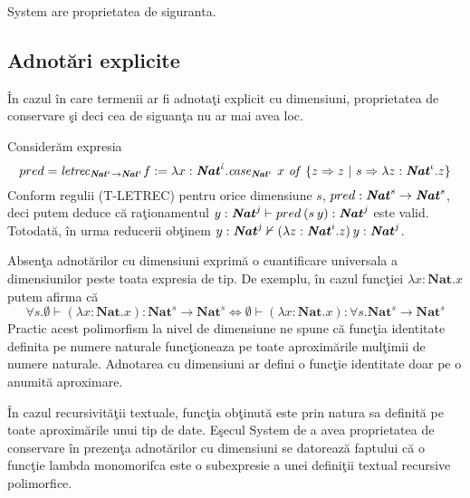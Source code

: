 \begin{corollary}
System \fhat are proprietatea de siguranta.
\end{corollary}

\subsection{Adnot\u ari explicite}

\^ In cazul \^ in care termenii ar fi adnota\c ti explicit cu dimensiuni, proprietatea de conservare \c si deci cea de siguan\c ta nu ar mai avea loc.
\begin{example}
Consider\u am expresia
$$ pred = \text{\emph{letrec}}_{\textbf{\emph{Nat}}^{\iota}\to\textbf{\emph{Nat}}^{\iota}} f := \lambda x: \textbf{\emph{Nat}}^{\hat{\iota}}.\text{\emph{case}}_{\textbf{\emph{Nat}}^{\iota}}\ x \text{ \emph{of} } \{ z \Rightarrow z\ |\ s \Rightarrow \lambda z : \textbf{\emph{Nat}}^{\iota}.z \}$$
Conform regulii {\scriptsize (T-LETREC)} pentru orice dimensiune $s$, $pred : \textbf{\emph{Nat}}^s \to \textbf{\emph{Nat}}^s$, deci putem deduce c\u a ra\c tionamentul $y : \textbf{\emph{Nat}}^j \vdash pred \hspace{2pt} (s \hspace{2pt} y) : \textbf{\emph{Nat}}^j$ este valid. Totodat\u a, \^ in urma reducerii ob\c tinem $y : \textbf{\emph{Nat}}^j \nvdash (\lambda z : \textbf{\emph{Nat}}^i.z)\hspace{2pt} y : \textbf{\emph{Nat}}^j$.
\end{example}

Absen\c ta adnot\u arilor cu dimensiuni exprim\u a o cuantificare universala a dimensiunilor peste toata expresia de tip. De exemplu, \^ in cazul func\c tiei $\lambda x : \textbf{Nat} . x$ putem afirma c\u a
$$\forall s . \emptyset \vdash (\lambda x : \textbf{Nat} . x) :  \textbf{Nat}^s \to  \textbf{Nat}^s \Leftrightarrow \emptyset \vdash (\lambda x : \textbf{Nat} . x) :  \forall s. \textbf{Nat}^s \to  \textbf{Nat}^s$$
Practic acest polimorfism la nivel de dimensiune ne spune c\u a func\c tia identitate definita pe numere naturale func\c tioneaza pe toate aproxim\u arile mul\c timii de numere naturale. Adnotarea cu dimensiuni ar defini o func\c tie identitate doar pe o anumit\u a aproximare.

\^ In cazul recursivit\u a\c tii textuale, func\c tia ob\c tinut\u a este prin natura sa definit\u a pe toate aproxim\u arile unui tip de date. E\c secul System \fhat de a avea proprietatea de conservare \^ in prezen\c ta adnot\u arilor cu dimensiuni se datoreaz\u a faptului c\u a o func\c tie lambda monomorifca este o subexpresie a unei defini\c tii textual recursive polimorfice.

